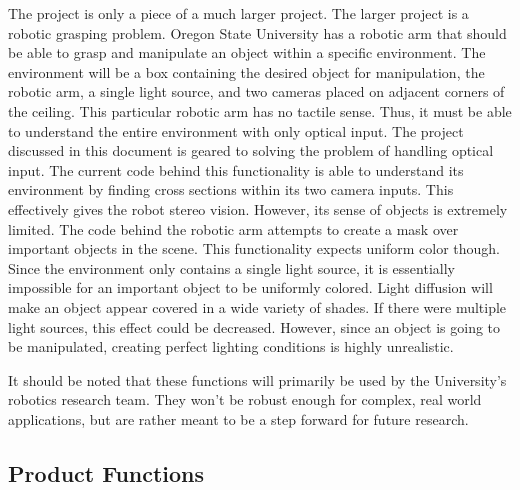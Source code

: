 \documentclass[10pt,journal,compsoc, draftclsnofoot,onecolumn]{IEEEtran}
\begin{document}
The project is only a piece of a much larger project.
The larger project is a robotic grasping problem.
Oregon State University has a robotic arm that should be able to grasp and manipulate an object within a specific environment.
The environment will be a box containing the desired object for manipulation, the robotic arm, a single light source, and two cameras placed on adjacent corners of the ceiling.
This particular robotic arm has no tactile sense.
Thus, it must be able to understand the entire environment with only optical input.
The project discussed in this document is geared to solving the problem of handling optical input.
The current code behind this functionality is able to understand its environment by finding cross sections within its two camera inputs.
This effectively gives the robot stereo vision.
However, its sense of objects is extremely limited.
The code behind the robotic arm attempts to create a mask over important objects in the scene.
This functionality expects uniform color though.
Since the environment only contains a single light source, it is essentially impossible for an important object to be uniformly colored.
Light diffusion will make an object appear covered in a wide variety of shades.
If there were multiple light sources, this effect could be decreased.
However, since an object is going to be manipulated, creating perfect lighting conditions is highly unrealistic.

\noindent
It should be noted that these functions will primarily be used by the University's robotics research team.
They won't be robust enough for complex, real world applications, but are rather meant to be a step forward for future research.


\subsection{Product Functions}
\end{document}
